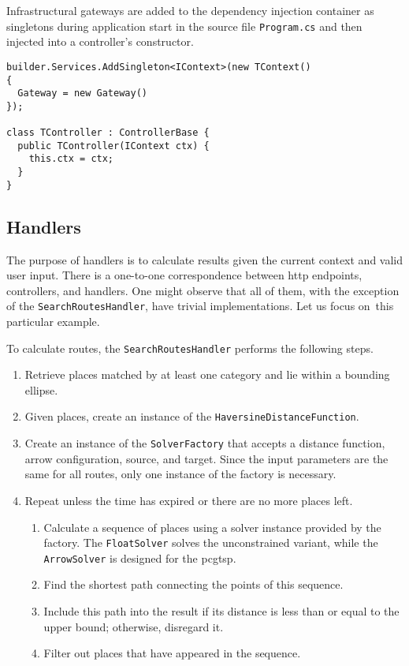 Infrastructural gateways are added to the dependency injection container as singletons during application start in the source file \texttt{Program.cs} and then injected into a controller's constructor.

\begin{verbatim}
builder.Services.AddSingleton<IContext>(new TContext()
{
  Gateway = new Gateway()
});

class TController : ControllerBase {
  public TController(IContext ctx) {
    this.ctx = ctx;
  }
}
\end{verbatim}

\subsection{Handlers}

The purpose of handlers is to calculate results given the current context and valid user input. There is a one-to-one correspondence between \acs{http} endpoints, controllers, and handlers. One might observe that all of them, with the exception of the \texttt{SearchRoutesHandler}, have trivial implementations. Let us focus on~this par\-tic\-u\-lar example.

To calculate routes, the \texttt{SearchRoutesHandler} performs the following steps.

\begin{enumerate}
\item Retrieve places matched by at least one category and lie within a bounding ellipse.
\item Given places, create an instance of the \texttt{HaversineDistanceFunction}.
\item Create an instance of the \texttt{SolverFactory} that accepts a distance function, arrow configuration, source, and target. Since the input parameters are the same for all routes, only one instance of the factory is necessary.
\item Repeat unless the time has expired or there are no more places left.
\begin{enumerate}
\item Calculate a sequence of places using a solver instance provided by the factory. The \texttt{FloatSolver} solves the unconstrained variant, while the \texttt{ArrowSolver} is designed for the \acs{pcgtsp}.
\item Find the shortest path connecting the points of this sequence.
\item Include this path into the result if its distance is less than or equal to the upper bound; otherwise, disregard it.
\item Filter out places that have appeared in the sequence.
\end{enumerate}
\end{enumerate}

